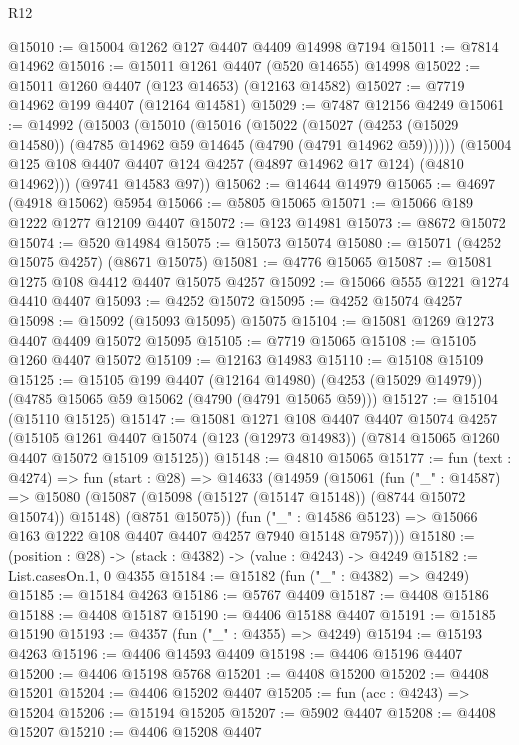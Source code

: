 \begin{lexlean}{R12}
\begin{coremodule}
@15010 := @15004 @1262 @127 @4407 @4409 @14998 @7194
@15011 := @7814 @14962
@15016 := @15011 @1261 @4407 (@520 @14655) @14998
@15022 := @15011 @1260 @4407 (@123 @14653) (@12163 @14582)
@15027 := @7719 @14962 @199 @4407 (@12164 @14581)
@15029 := @7487 @12156 @4249
@15061 := @14992
    (@15003
      (@15010
        (@15016
          (@15022
            (@15027 (@4253 (@15029 @14580)) (@4785 @14962 @59 @14645 (@4790 (@4791 @14962 @59))))))
        (@15004 @125 @108 @4407 @4407 @124 @4257 (@4897 @14962 @17 @124) (@4810 @14962)))
      (@9741 @14583 @97))
@15062 := @14644 @14979
@15065 := @4697 (@4918 @15062) @5954
@15066 := @5805 @15065
@15071 := @15066 @189 @1222 @1277 @12109 @4407
@15072 := @123 @14981
@15073 := @8672 @15072
@15074 := @520 @14984
@15075 := @15073 @15074
@15080 := @15071 (@4252 @15075 @4257) (@8671 @15075)
@15081 := @4776 @15065
@15087 := @15081 @1275 @108 @4412 @4407 @15075 @4257
@15092 := @15066 @555 @1221 @1274 @4410 @4407
@15093 := @4252 @15072
@15095 := @4252 @15074 @4257
@15098 := @15092 (@15093 @15095) @15075
@15104 := @15081 @1269 @1273 @4407 @4409 @15072 @15095
@15105 := @7719 @15065
@15108 := @15105 @1260 @4407 @15072
@15109 := @12163 @14983
@15110 := @15108 @15109
@15125 := @15105
    @199
    @4407
    (@12164 @14980)
    (@4253 (@15029 @14979))
    (@4785 @15065 @59 @15062 (@4790 (@4791 @15065 @59)))
@15127 := @15104 (@15110 @15125)
@15147 := @15081
    @1271
    @108
    @4407
    @4407
    @15074
    @4257
    (@15105
      @1261
      @4407
      @15074
      (@123 (@12973 @14983))
      (@7814 @15065 @1260 @4407 @15072 @15109 @15125))
@15148 := @4810 @15065
@15177 := fun (text : @4274) =>
  fun (start : @28) =>
  @14633
    (@14959
      (@15061
        (fun ("_" : @14587) =>
        @15080
          (@15087 (@15098 (@15127 (@15147 @15148)) (@8744 @15072 @15074)) @15148)
          (@8751 @15075))
        (fun ("_" : @14586 @5123) => @15066 @163 @1222 @108 @4407 @4407 @4257 @7940 @15148 @7957)))
@15180 := (position : @28) -> (stack : @4382) -> (value : @4243) -> @4249
@15182 := List.casesOn.{1, 0} @4355
@15184 := @15182 (fun ("_" : @4382) => @4249)
@15185 := @15184 @4263
@15186 := @5767 @4409
@15187 := @4408 @15186
@15188 := @4408 @15187
@15190 := @4406 @15188 @4407
@15191 := @15185 @15190
@15193 := @4357 (fun ("_" : @4355) => @4249)
@15194 := @15193 @4263
@15196 := @4406 @14593 @4409
@15198 := @4406 @15196 @4407
@15200 := @4406 @15198 @5768
@15201 := @4408 @15200
@15202 := @4408 @15201
@15204 := @4406 @15202 @4407
@15205 := fun (acc : @4243) => @15204
@15206 := @15194 @15205
@15207 := @5902 @4407
@15208 := @4408 @15207
@15210 := @4406 @15208 @4407

\end{coremodule}
\end{lexlean}
